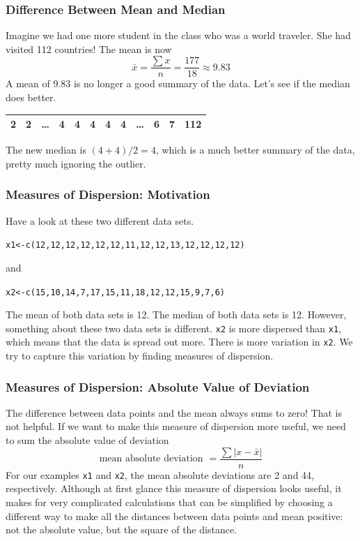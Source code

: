 \documentclass[xcolor=dvipsnames]{beamer}
\begin{document}
\begin{frame}
  \frametitle{Difference Between Mean and Median}
Imagine we had one more student in the class who was a world traveler.
She had visited 112 countries! The mean is now
\begin{equation}
  \label{eq:zephahwu}
  \bar{x}=\frac{\sum{}x}{n}=\frac{177}{18}\approx{}9.83
\end{equation}
A mean of 9.83 is no longer a good summary of the data. Let's see if
the median does better.

\medskip

\begin{tabular}{|c|c|c|c|c|c|c|c|c|c|c|c|}\hline
2&2&{\ldots}&4&4&\alert{4}&\alert{4}&4&{\ldots}&6&7&112 \\ \hline
\end{tabular}

\medskip

The new median is $(4+4)/2=4$, which is a much better summary of the
data, pretty much ignoring the outlier.
\end{frame}

\begin{frame}
  \frametitle{Measures of Dispersion: Motivation}
Have a look at these two different data sets.
\begin{alltt}
x1<-c(12,12,12,12,12,12,11,12,12,13,12,12,12,12)
\end{alltt}
and
\begin{alltt}
x2<-c(15,10,14,7,17,15,11,18,12,12,15,9,7,6)
\end{alltt}
The mean of both data sets is 12. The median of both data sets is 12.
However, something about these two data sets is different. \texttt{x2}
is more dispersed than \texttt{x1}, which means that the data is
spread out more. There is more variation in \texttt{x2}. We try to
capture this variation by finding measures of dispersion.
\end{frame}

\begin{frame}
  \frametitle{Measures of Dispersion: Absolute Value of Deviation}
The difference between data points and the mean always sums to zero!
That is not helpful. If we want to make this measure of dispersion
more useful, we need to sum the \alert{absolute value of deviation}
\begin{equation}
  \label{eq:riquithu}
  \mbox{mean absolute deviation }=\frac{\sum{}\vert{}x-\bar{x}\vert}{n}
\end{equation}
For our examples \texttt{x1} and \texttt{x2}, the mean absolute
deviations are 2 and 44, respectively. Although at first glance this
measure of dispersion looks useful, it makes for very complicated
calculations that can be simplified by choosing a different way to
make all the distances between data points and mean positive: not the
absolute value, but the square of the distance.
\end{frame}
\end{document}
